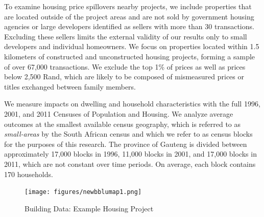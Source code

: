 \documentclass[12pt]{article}
\begin{document}

To examine housing price spillovers nearby projects, we include properties that are located outside of the project areas and are not sold by government housing agencies or large developers identified as sellers with more than 30 transactions.  Excluding these sellers limits the external validity of our results only to small developers and individual homeowners.  We focus on properties located within 1.5 kilometers of constructed and unconstructed housing projects, forming a sample of over 67,000 transactions.  We exclude the top 1\% of prices as well as prices below 2,500 Rand, which are likely to be composed of mismeasured prices or titles exchanged between family members. 



We measure impacts on dwelling and household characteristics with the full 1996, 2001, and 2011 Censuses of Population and Housing. We analyze average outcomes at the smallest available census geography, which is referred to as {\it small-areas} by the South African census and which we refer to as census blocks for the purposes of this research.  The province of Gauteng is divided between approximately 17,000 blocks in 1996, 11,000 blocks in 2001, and 17,000 blocks in 2011, which are not constant over time periods.  On average, each block contains 170 households. 


\begin{figure}[t!]
        \centering
        \caption[ Building Data: Example Housing Project]
        {\small Building Data: Example Housing Project } 
        \vspace{2mm}
\texttt{[image: figures/newbblumap1.png]}
        \label{fig:bblumaps}
\end{figure} 
\end{document}
